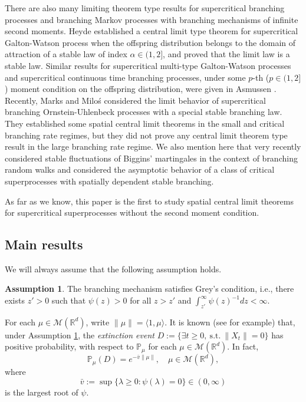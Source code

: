 \documentclass[12pt,a4paper]{amsart}
\theoremstyle{plain}
\theoremstyle{definition}
\newtheorem{asp}{Assumption}
\numberwithin{equation}{section}
\begin{document}
    There are also many limiting theorem type results 
    for supercritical branching processes and branching Markov processes
    with branching mechanisms of infinite second moments.
    Heyde \cite{Heyde1971Some} established a central limit type  theorem 
    for supercritical Galton-Watson process when the offspring distribution
    belongs to the domain of attraction of a stable law of index $\alpha\in (1, 2]$,
    and   proved that the limit law is  a stable law. Similar results  for supercritical multi-type Galton-Watson processes and supercritical  continuous time branching processes, under some $p$-th ($p\in(1,2]$) moment condition on the offspring distribution,
    were given in Asmussen \cite{Asmussen76Convergence}.
    Recently,   Marks and Milo\'s \cite{MarksMilos2018CLT}
    considered the limit behavior of supercritical branching Ornstein-Uhlenbeck processes with a special stable branching law.
	They established some spatial central limit theorems in the small and critical branching rate regimes,
    but they did not prove any central limit theorem type result in the large branching rate regime.
    We also mention here that very recently \cite{IksanovKoleskoMeiners2018Stable-like} considered stable fluctuations of Biggins' martingales in the context of branching random walks and \cite{RenSongSun2018Limit} considered the asymptotic behavior of a class of critical superprocesses with spatially dependent stable branching.

    As far as we know, this paper is the
   first to study spatial central limit theorems
    for supercritical superprocesses without the second moment condition.


\subsection{Main results}
\label{sec: main results}{}

We will always assume that the following assumption holds.
\begin{asp}
\label{asp: Greys condition}
	The branching mechanism satisfies Grey's condition, i.e., there exists $z' > 0$ such that $\psi(z) > 0$ for all $z>z'$ and  $\int_{z'}^\infty \psi(z)^{-1}dz < \infty$.
\end{asp}
    For each $\mu \in \mathcal M(\mathbb R^d)$, write $\|\mu\| = \langle 1, \mu\rangle$.
	It is known (see \cite[Theorems 12.5 \& 12.7]{Kyprianou2014Fluctuations} for example) that, under Assumption \ref{asp: Greys condition},
	the \emph{extinction event}
	$D:=\{\exists t\geq 0,~\text{s.t.}~\|X_t\|=0\}$ has positive probability, with respect to $\mathbb P_\mu$ for each  $\mu \in \mathcal M(\mathbb R^d)$.
    In fact,
\begin{equation}
    \mathbb{P}_{\mu} (D)
    = e^{-\bar v \|\mu\|},
    \quad \mu\in \mathcal M(\mathbb R^d),
\end{equation}
    where
\[
	\bar v := \sup\{\lambda \geq 0: \psi(\lambda) = 0\} \in (0,\infty)
\]
	is the largest root of $\psi$.
\end{document}
